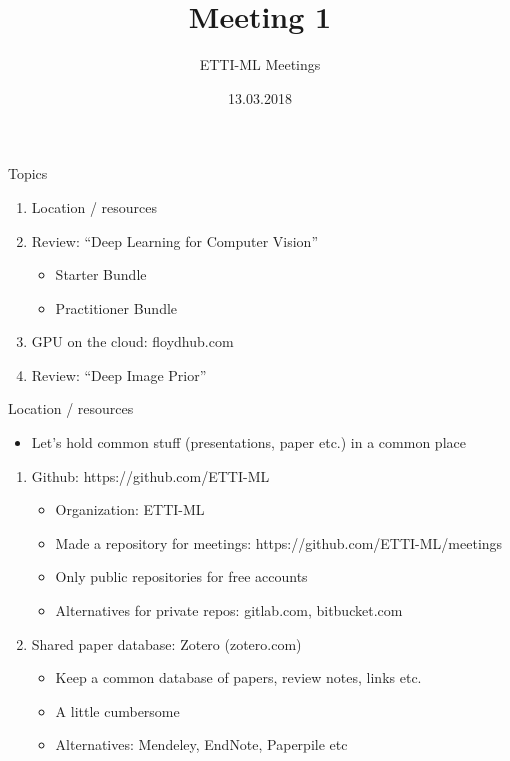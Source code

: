 \documentclass[ignorenonframetext,]{beamer}
\title{Meeting 1}
\subtitle{ETTI-ML Meetings}
\date{13.03.2018}
\providecommand{\tightlist}{%
  \setlength{\itemsep}{0pt}\setlength{\parskip}{0pt}}
\begin{document}
\frame{\titlepage}

\begin{frame}{Topics}

\begin{enumerate}
\def\labelenumi{\arabic{enumi}.}
\item
  Location / resources
\item
  Review: ``Deep Learning for Computer Vision''

  \begin{itemize}
  \tightlist
  \item
    Starter Bundle
  \item
    Practitioner Bundle
  \end{itemize}
\item
  GPU on the cloud: floydhub.com
\item
  Review: ``Deep Image Prior''
\end{enumerate}

\end{frame}

\begin{frame}{Location / resources}

\begin{itemize}
\tightlist
\item
  Let's hold common stuff (presentations, paper etc.) in a common place
\end{itemize}

\begin{enumerate}
\def\labelenumi{\arabic{enumi}.}
\tightlist
\item
  Github: https://github.com/ETTI-ML

  \begin{itemize}
  \tightlist
  \item
    Organization: ETTI-ML
  \item
    Made a repository for meetings: https://github.com/ETTI-ML/meetings
  \item
    Only public repositories for free accounts
  \item
    Alternatives for private repos: gitlab.com, bitbucket.com
  \end{itemize}
\item
  Shared paper database: Zotero (zotero.com)

  \begin{itemize}
  \tightlist
  \item
    Keep a common database of papers, review notes, links etc.
  \item
    A little cumbersome
  \item
    Alternatives: Mendeley, EndNote, Paperpile etc
  \end{itemize}
\end{enumerate}

\end{frame}
\end{document}
